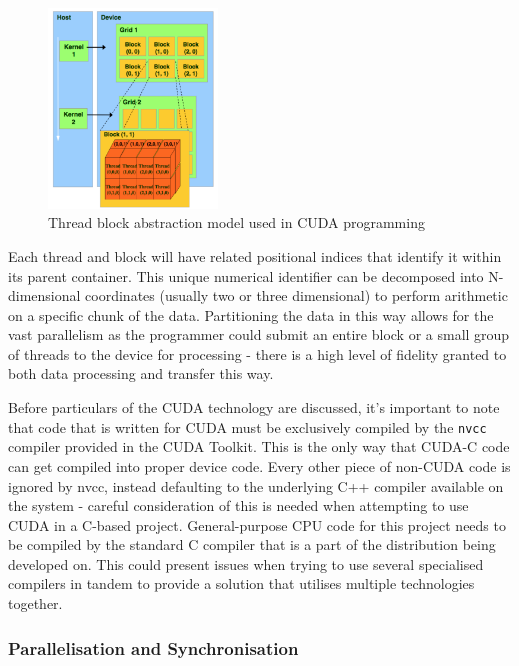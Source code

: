 \documentclass[conference]{IEEEtran}
\begin{document}
\begin{figure}[!h]
    \centering
    \includegraphics[width=0.4\textwidth]{images/grid_block_thread.png}
    \caption{Thread block abstraction model used in CUDA programming}
    \label{fig:gridblockthread}
\end{figure}

Each thread and block will have related positional indices that identify it within its parent container. This unique numerical identifier can be decomposed into N-dimensional coordinates (usually two or three dimensional) to perform arithmetic on a specific chunk of the data. Partitioning the data in this way allows for the vast parallelism as the programmer could submit an entire block or a small group of threads to the device for processing - there is a high level of fidelity granted to both data processing and transfer this way.

Before particulars of the CUDA technology are discussed, it's important to note that code that is written for CUDA must be exclusively compiled by the \texttt{nvcc} compiler provided in the CUDA Toolkit. This is the only way that CUDA-C code can get compiled into proper device code. Every other piece of non-CUDA code is ignored by nvcc, instead defaulting to the underlying C++ compiler available on the system - careful consideration of this is needed when attempting to use CUDA in a C-based project. General-purpose CPU code for this project needs to be compiled by the standard C compiler that is a part of the distribution being developed on. This could present issues when trying to use several specialised compilers in tandem to provide a solution that utilises multiple technologies together.

\subsubsection{Parallelisation and Synchronisation}
\end{document}
